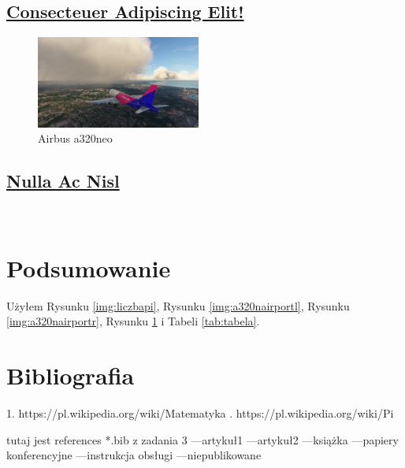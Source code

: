 \documentclass[]{article}
\begin{document}
\newpage
    \subsection{\underline{Consecteuer Adipiscing Elit!}}
    \lipsum[15-19]
   
\begin{figure}
  \centering
  \includegraphics[width=0.48\textwidth]{landing.png}
  \caption{Airbus a320neo}
  \label{img:a320n}
\end{figure}

\newpage
    \subsection{\underline{Nulla Ac Nisl}}
    \lipsum[20-22] \\

\newpage

\section{Podsumowanie}
Użyłem Rysunku \ref{img:liczbapi}, Rysunku \ref{img:a320nairportl}, Rysunku \ref{img:a320nairportr}, Rysunku \ref{img:a320n} i Tabeli \ref{tab:tabela}.



\section{Bibliografia}
1.  https://pl.wikipedia.org/wiki/Matematyka
.  https://pl.wikipedia.org/wiki/Pi
\newline

tutaj jest references *.bib z zadania 3\newline
---artykuł1\cite{art1}\newline
---artykuł2\cite{art2}\newline
---książka\cite{book1}\newline
---papiery konferencyjne\cite{conf1}\newline
---instrukcja obsługi\cite{manual1}\newline
---niepublikowane\cite{unpub1}\newline


\printbibliography
\end{document}
